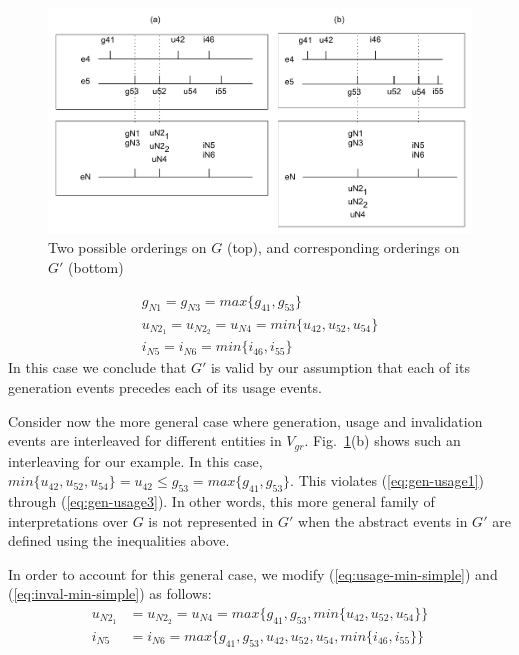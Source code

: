 \begin{figure}
\centering
\includegraphics[scale=.5]{figures/e-grouping-orderings.pdf} 
\caption{Two possible orderings on $G$ (top), and corresponding orderings on $G'$ (bottom)} \label{fig:e-grouping-orderings}
\end{figure}


\begin{align}
g_{N1} = g_{N3} = max\{g_{41}, g_{53}\}   \label{eq:max} \\
u_{N2_1} = u_{N2_2}  = u_{N4} = min\{u_{42},  u_{52},  u_{54}\}   \label{eq:usage-min-simple} \\
i_{N5} = i_{N6}  = min \{   i_{46},  i_{55} \}   \label{eq:inval-min-simple}
\end{align}
In this case we conclude that $G'$ is valid by our assumption that each of its generation events precedes each of its usage events.

Consider now the more general case where generation, usage and invalidation events are interleaved for different entities in $V_{gr}$. Fig.~\ref{fig:e-grouping-orderings}(b) shows such an interleaving for our example. In this case, 
$min \{   u_{42},  u_{52},  u_{54} \} = u_{42} \leq g_{53} = max\{g_{41}, g_{53}\}$.
%
This violates (\ref{eq:gen-usage1}) through (\ref{eq:gen-usage3}).  In other words, this more general family of interpretations over $G$ is not represented in $G'$ when the abstract events in $G'$ are defined using the inequalities above. 

In order to account for this general case, we modify  (\ref{eq:usage-min-simple}) and (\ref{eq:inval-min-simple}) as follows:
\begin{align}
u_{N2_1} &= u_{N2_2}  = u_{N4} = max\{ g_{41}, g_{53}, min \{u_{42},  u_{52},  u_{54}\}\}  \label{eq:usage-min} \\
i_{N5} &= i_{N6}  = max\{g_{41}, g_{53}, u_{42},  u_{52},  u_{54}, min\{i_{46},  i_{55}\}\}   \label{eq:inval-min}
\end{align}
%

